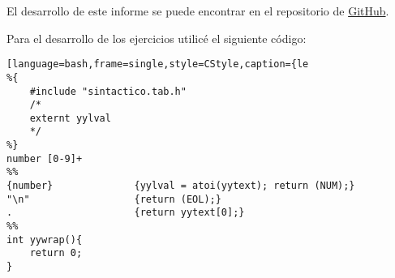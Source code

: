 \documentclass[12pt]{article}
\title{
\centerline{
    \texttt{[image: unsa.png]}}
    \vspace{0.5 cm}
        Teoría de la Computación - Laboratorio A
        \\
        \\
        \\
        \textbf{Práctica de Laboratorio #8} 
        \large  
        \\
        \small Universidad Nacional de San Agustín - Escuela Profesional de Ingeniería de Sistemas, Arequipa, Perú 
  }
\author{
    Carlos Alberto Mestas Escarcena
    \\
    \texttt{cmestas@unsa.edu.pe}
}
\date{Julio del 2020}
\begin{document}
\maketitle

El desarrollo de este informe se puede encontrar en el repositorio de \textcolor{blue}{
    \href{https://github.com/CarlosMestas/TC_A_8_Carlos_Mestas}{GitHub}}.
\\
\newline

Para el desarrollo de los ejercicios utilicé el siguiente código:

\begin{lstlisting}[language=bash,frame=single,style=CStyle,caption={le
%{
    #include "sintactico.tab.h"
    /*
    externt yylval
    */
%}
number [0-9]+
%%
{number}              {yylval = atoi(yytext); return (NUM);}
"\n"                  {return (EOL);}
.                     {return yytext[0];}
%%
int yywrap(){
    return 0;
}
\end{lstlisting}
\end{document}
